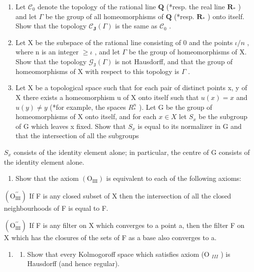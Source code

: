 \begin{enumerate}
\def\labelenumi{\alph{enumi})}
\setcounter{enumi}{2}
\item
  Let \(\mathcal{C}_{0}\) denote the topology of the rational line \(\mathbf{Q}\) (*resp. the real line \(\mathbf{R}_{*}\) ) and let \(\Gamma\) be the group of all homeomorphisms of \(\mathbf{Q}\) (*resp. \(\mathbf{R}_{*}\) ) onto itself. Show that the topology \(\mathcal{C}_{\mathbf{J}}(\Gamma)\) is the same as \(\mathcal{C}_{0}\) .
\item
  Let X be the subspace of the rational line consisting of 0 and the points \(\iota/n\) , where n is an integer \(\geqslant\iota\) , and let \(\Gamma\) be the group of homeomorphisms of X. Show that the topology \(\mathcal{G}_{\mathrm{J}}(\Gamma)\) is not Hausdorff, and that the group of homeomorphisms of X with respect to this topology is \(\Gamma\) .
\item
  Let X be a topological space such that for each pair of distinct points x, y of X there exists a homeomorphism u of X onto itself such that \(u(x) = x\) and \(u(y) \neq y\) (*for example, the spaces \(R^{n}_{*}\) ). Let G be the group of homeomorphisms of X onto itself, and for each \(x \in X\) let \(S_{x}\) be the subgroup of G which leaves x fixed. Show that \(S_{x}\) is equal to its normalizer in G and that the intersection of all the subgroups
\end{enumerate}

\(S_{x}\) consists of the identity element alone; in particular, the centre of G consists of the identity element alone.

\begin{enumerate}
\def\labelenumi{\arabic{enumi})}
\setcounter{enumi}{13}
\tightlist
\item
  Show that the axiom \((\mathrm{O}_{\mathrm{III}})\) is equivalent to each of the following axioms:
\end{enumerate}

\((\mathrm{O}_{\mathrm{III}}^{\prime\prime})\) If F is any closed subset of X then the intersection of all the closed neighbourhoods of F is equal to F.

\((\mathrm{O}_{\mathrm{III}}^{\prime\prime})\) If F is any filter on X which converges to a point a, then the filter F on X which has the closures of the sets of F as a base also converges to a.

\begin{enumerate}
\def\labelenumi{\arabic{enumi})}
\setcounter{enumi}{14}
\tightlist
\item
  \begin{enumerate}
  \def\labelenumii{\alph{enumii})}
  \tightlist
  \item
    Show that every Kolmogoroff space which satisfies axiom (O \(_{III}\) ) is Hausdorff (and hence regular).
  \end{enumerate}
\end{enumerate}

